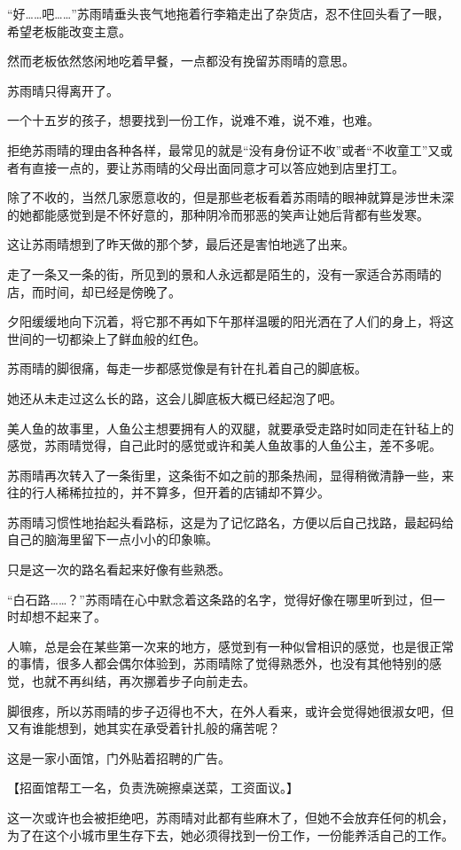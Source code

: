 “好……吧……”苏雨晴垂头丧气地拖着行李箱走出了杂货店，忍不住回头看了一眼，希望老板能改变主意。

然而老板依然悠闲地吃着早餐，一点都没有挽留苏雨晴的意思。

苏雨晴只得离开了。

一个十五岁的孩子，想要找到一份工作，说难不难，说不难，也难。

拒绝苏雨晴的理由各种各样，最常见的就是“没有身份证不收”或者“不收童工”又或者有直接一点的，要让苏雨晴的父母出面同意才可以答应她到店里打工。

除了不收的，当然几家愿意收的，但是那些老板看着苏雨晴的眼神就算是涉世未深的她都能感觉到是不怀好意的，那种阴冷而邪恶的笑声让她后背都有些发寒。

这让苏雨晴想到了昨天做的那个梦，最后还是害怕地逃了出来。

走了一条又一条的街，所见到的景和人永远都是陌生的，没有一家适合苏雨晴的店，而时间，却已经是傍晚了。

夕阳缓缓地向下沉着，将它那不再如下午那样温暖的阳光洒在了人们的身上，将这世间的一切都染上了鲜血般的红色。

苏雨晴的脚很痛，每走一步都感觉像是有针在扎着自己的脚底板。

她还从未走过这么长的路，这会儿脚底板大概已经起泡了吧。

美人鱼的故事里，人鱼公主想要拥有人的双腿，就要承受走路时如同走在针毡上的感觉，苏雨晴觉得，自己此时的感觉或许和美人鱼故事的人鱼公主，差不多呢。

苏雨晴再次转入了一条街里，这条街不如之前的那条热闹，显得稍微清静一些，来往的行人稀稀拉拉的，并不算多，但开着的店铺却不算少。

苏雨晴习惯性地抬起头看路标，这是为了记忆路名，方便以后自己找路，最起码给自己的脑海里留下一点小小的印象嘛。

只是这一次的路名看起来好像有些熟悉。

“白石路……？”苏雨晴在心中默念着这条路的名字，觉得好像在哪里听到过，但一时却想不起来了。

人嘛，总是会在某些第一次来的地方，感觉到有一种似曾相识的感觉，也是很正常的事情，很多人都会偶尔体验到，苏雨晴除了觉得熟悉外，也没有其他特别的感觉，也就不再纠结，再次挪着步子向前走去。

脚很疼，所以苏雨晴的步子迈得也不大，在外人看来，或许会觉得她很淑女吧，但又有谁能想到，她其实在承受着针扎般的痛苦呢？

这是一家小面馆，门外贴着招聘的广告。

【招面馆帮工一名，负责洗碗擦桌送菜，工资面议。】

这一次或许也会被拒绝吧，苏雨晴对此都有些麻木了，但她不会放弃任何的机会，为了在这个小城市里生存下去，她必须得找到一份工作，一份能养活自己的工作。

